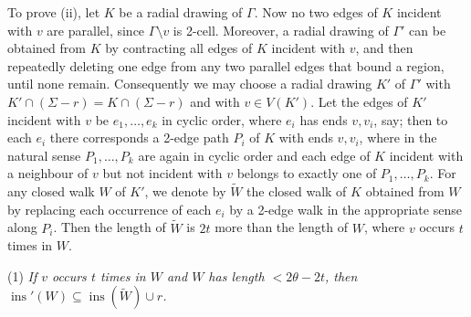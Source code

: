 To prove (ii), let $K$ be a radial drawing of $\Gamma$. Now no two edges of $K$ incident with $v$ are parallel, since $\Gamma \setminus v$ is 2-cell. Moreover, a radial drawing of $\Gamma'$ can be obtained from $K$ by contracting all edges of $K$ incident with $v$, and then repeatedly deleting one edge from any two parallel edges that bound a region, until none remain. Consequently we may choose a radial drawing $K'$ of $\Gamma'$ with $K' \cap (\Sigma - r) = K \cap (\Sigma - r)$ and with $v \in V(K')$. Let the edges of $K'$ incident with $v$ be $e_1, \dots, e_k$ in cyclic order, where $e_i$ has ends $v, v_i$, say; then to each $e_i$ there corresponds a 2-edge path $P_i$ of $K$ with ends $v, v_i$, where in the natural sense $P_1, \dots, P_k$ are again in cyclic order and each edge of $K$ incident with a neighbour of $v$ but not incident with $v$ belongs to exactly one of $P_1, \dots, P_k$. For any closed walk $W$ of $K'$, we denote by $\widetilde{W}$ the closed walk of $K$ obtained from $W$ by replacing each occurrence of each $e_i$ by a 2-edge walk in the appropriate sense along $P_i$. Then the length of $\widetilde{W}$ is $2t$ more than the length of $W$, where $v$ occurs $t$ times in $W$.

\hspace*{12pt}(1) \textit{If $v$ occurs $t$ times in $W$ and $W$ has length $< 2\theta - 2t$, then $\operatorname{ins}'(W) \subseteq \operatorname{ins}(\widetilde{W}) \cup r$.}
